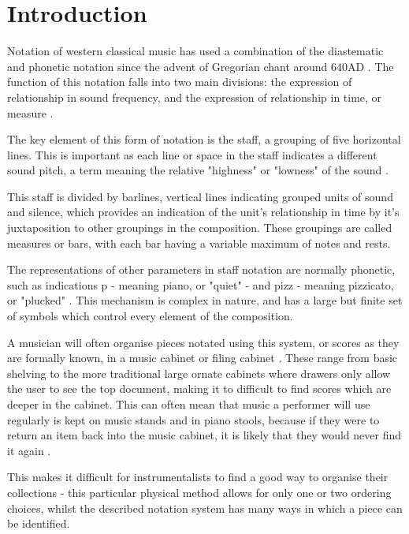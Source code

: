 \documentclass[bibtotocnumbered]{article}
\begin{document}
\section{Introduction}
Notation of western classical music has used a combination of the diastematic and phonetic notation \parencite{RRastall} since the advent of Gregorian chant around 640AD \parencite{RTaruskin}. The function of this notation falls into two main divisions: the expression of relationship in sound frequency, and the expression of relationship in time, or measure \parencite{oxHistory}.

The key element of this form of notation is the staff, a grouping of five horizontal lines. This is important as each line or space in the staff indicates a different sound pitch, a term meaning the relative "highness" or "lowness" of the sound \parencite{classroom}.

This staff is divided by barlines, vertical lines indicating grouped units of sound and silence, which provides an indication of the unit's relationship in time by it's juxtaposition to other groupings in the composition. These groupings are called measures or bars, with each bar having a variable maximum of notes and rests. 

The representations of other parameters in staff notation are normally phonetic, such as indications p - meaning piano, or "quiet" - and pizz - meaning pizzicato, or "plucked" \parencite{RRastall}. This mechanism is complex in nature, and has a large but finite set of symbols which control every element of the composition.

A musician will often organise pieces notated using this system, or scores as they are formally known, in a music cabinet or filing cabinet \parencite{musicOrganising}. These range from basic shelving to the more traditional large ornate cabinets where drawers only allow the user to see the top document, making it to difficult to find scores which are deeper in the cabinet. This can often mean that music a performer will use regularly is kept on music stands and in piano stools, because if they were to return an item back into the music cabinet, it is likely that they would never find it again \parencite{SheetMusicRant}.

This makes it difficult for instrumentalists to find a good way to organise their collections - this particular physical method allows for only one or two ordering choices, whilst the described notation system has many ways in which a piece can be identified. 
\end{document}
